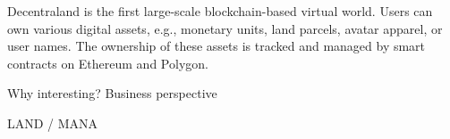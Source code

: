\documentclass[12pt,a4paper,titlepage,oneside,english]{article}
\begin{document}
Decentraland is the first large-scale blockchain-based virtual world. Users can own various digital assets, e.g., monetary units, land parcels, avatar apparel, or user names. The ownership of these assets is tracked and managed by smart contracts on Ethereum and Polygon. \citep{goldbergschaer}

 Why interesting? Business perspective
 
 
LAND / MANA
 
\end{document}
